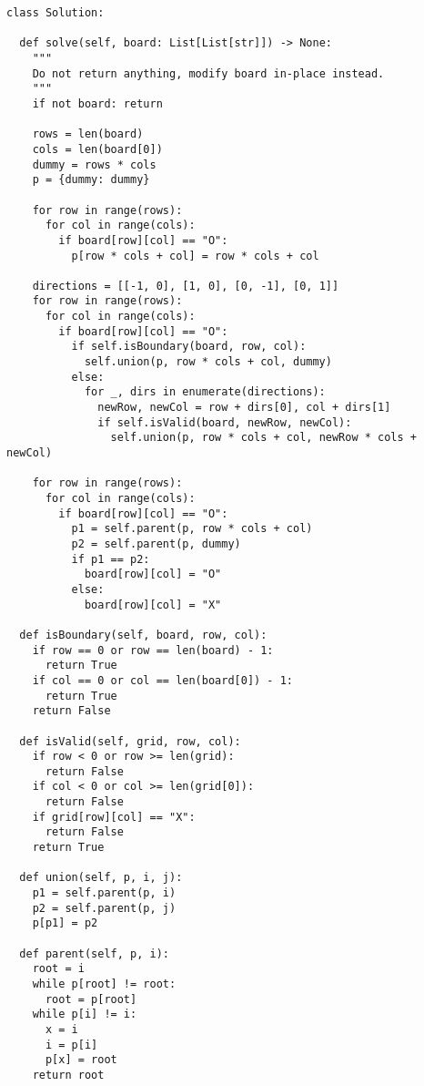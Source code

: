 \begin{verbatim}
class Solution:

  def solve(self, board: List[List[str]]) -> None:
    """
    Do not return anything, modify board in-place instead.
    """
    if not board: return

    rows = len(board)
    cols = len(board[0])
    dummy = rows * cols
    p = {dummy: dummy}

    for row in range(rows):
      for col in range(cols):
        if board[row][col] == "O":
          p[row * cols + col] = row * cols + col

    directions = [[-1, 0], [1, 0], [0, -1], [0, 1]]
    for row in range(rows):
      for col in range(cols):
        if board[row][col] == "O":
          if self.isBoundary(board, row, col):
            self.union(p, row * cols + col, dummy)
          else:
            for _, dirs in enumerate(directions):
              newRow, newCol = row + dirs[0], col + dirs[1]
              if self.isValid(board, newRow, newCol):
                self.union(p, row * cols + col, newRow * cols + newCol)

    for row in range(rows):
      for col in range(cols):
        if board[row][col] == "O":
          p1 = self.parent(p, row * cols + col)
          p2 = self.parent(p, dummy)
          if p1 == p2:
            board[row][col] = "O"
          else:
            board[row][col] = "X"

  def isBoundary(self, board, row, col):
    if row == 0 or row == len(board) - 1:
      return True
    if col == 0 or col == len(board[0]) - 1:
      return True
    return False

  def isValid(self, grid, row, col):
    if row < 0 or row >= len(grid):
      return False
    if col < 0 or col >= len(grid[0]):
      return False
    if grid[row][col] == "X":
      return False
    return True

  def union(self, p, i, j):
    p1 = self.parent(p, i)
    p2 = self.parent(p, j)
    p[p1] = p2

  def parent(self, p, i):
    root = i
    while p[root] != root:
      root = p[root]
    while p[i] != i:
      x = i
      i = p[i]
      p[x] = root
    return root
\end{verbatim}
